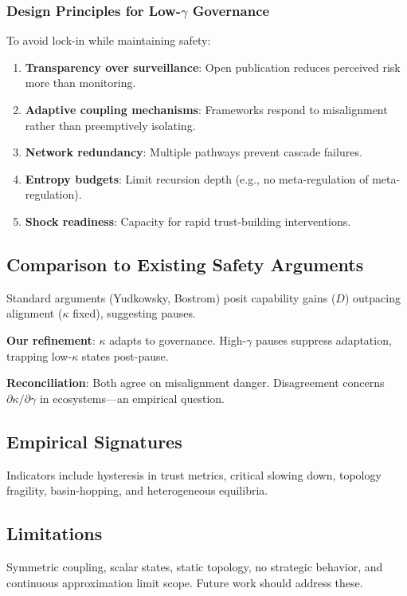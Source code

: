 \documentclass[12pt,a4paper]{article}
\begin{document}
\subsubsection{Design Principles for Low-$\gamma$ Governance}
To avoid lock-in while maintaining safety:
\begin{enumerate}
\item \textbf{Transparency over surveillance}: Open publication reduces perceived risk more than monitoring.
\item \textbf{Adaptive coupling mechanisms}: Frameworks respond to misalignment rather than preemptively isolating.
\item \textbf{Network redundancy}: Multiple pathways prevent cascade failures.
\item \textbf{Entropy budgets}: Limit recursion depth (e.g., no meta-regulation of meta-regulation).
\item \textbf{Shock readiness}: Capacity for rapid trust-building interventions.
\end{enumerate}

\subsection{Comparison to Existing Safety Arguments}
Standard arguments (Yudkowsky, Bostrom) posit capability gains ($D$) outpacing alignment ($\kappa$ fixed), suggesting pauses.

\textbf{Our refinement}: $\kappa$ adapts to governance. High-$\gamma$ pauses suppress adaptation, trapping low-$\kappa$ states post-pause.

\textbf{Reconciliation}: Both agree on misalignment danger. Disagreement concerns $\partial \kappa / \partial \gamma$ in ecosystems---an empirical question.

\subsection{Empirical Signatures}
Indicators include hysteresis in trust metrics, critical slowing down, topology fragility, basin-hopping, and heterogeneous equilibria.

\subsection{Limitations}
Symmetric coupling, scalar states, static topology, no strategic behavior, and continuous approximation limit scope. Future work should address these.
\end{document}
